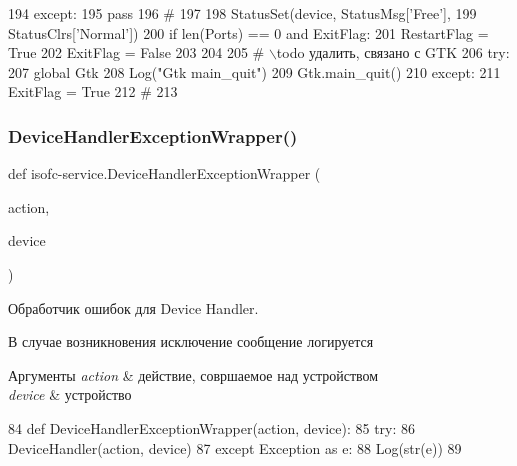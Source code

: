 \begin{DoxyCode}
194         \textcolor{keywordflow}{except}:
195             \textcolor{keywordflow}{pass}
196         \textcolor{comment}{#}
197 
198         StatusSet(device, StatusMsg[\textcolor{stringliteral}{'Free'}],
199                   StatusClrs[\textcolor{stringliteral}{'Normal'}])
200         \textcolor{keywordflow}{if} len(Ports) == 0 \textcolor{keywordflow}{and} ExitFlag:
201             RestartFlag = \textcolor{keyword}{True}
202             ExitFlag = \textcolor{keyword}{False}
203 
204 
205 \textcolor{comment}{# \(\backslash\)todo  удалить, связано с GTK}
206         \textcolor{keywordflow}{try}:
207             \textcolor{keyword}{global} Gtk
208             Log(\textcolor{stringliteral}{"Gtk main\_quit"})
209             Gtk.main\_quit()
210         \textcolor{keywordflow}{except}:
211             ExitFlag = \textcolor{keyword}{True}
212 \textcolor{comment}{#}
213 
\end{DoxyCode}
\mbox{\label{isofc-service_8py_file_a5985ea75b9e7f9724d6cb7e742afc890}} 
\subsubsection{\texorpdfstring{Device\+Handler\+Exception\+Wrapper()}{DeviceHandlerExceptionWrapper()}}
{\footnotesize\ttfamily def isofc-\/service.\+Device\+Handler\+Exception\+Wrapper (\begin{DoxyParamCaption}\item[{}]{action,  }\item[{}]{device }\end{DoxyParamCaption})}



Обработчик ошибок для Device Handler. 

В случае возникновения исключение сообщение логируется 
\begin{DoxyParams}{Аргументы}
{\em action} & действие, совршаемое над устройством \\
\hline
{\em device} & устройство \\
\hline
\end{DoxyParams}

\begin{DoxyCode}
84 \textcolor{keyword}{def }DeviceHandlerExceptionWrapper(action, device):
85     \textcolor{keywordflow}{try}:
86         DeviceHandler(action, device)
87     \textcolor{keywordflow}{except} Exception \textcolor{keyword}{as} e:
88         Log(str(e))
89 
\end{DoxyCode}
\mbox{\label{isofc-service_8py_file_a316116b0d70bb8af538da4fab408d0cf}} 

